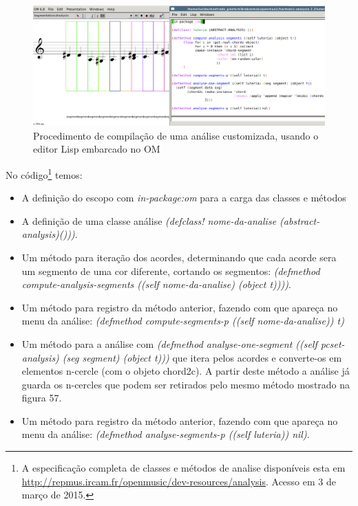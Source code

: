 \documentclass[
	12pt,				%
	openright,			%
	twoside,			%
	a4paper,			%
	english,			%
	french,				%
	spanish,			%
	brazil				%
	]{abntex2}
\begin{document}
				
\begin{figure}[!h]
	\caption{\label{fig_grafico}Procedimento de compilação de uma análise customizada, usando o editor Lisp embarcado no OM }
	\begin{center}
	    \includegraphics[scale=0.3]{OM_settheory/Analise_customizada.png}
	\end{center}
\end{figure}	

No código\footnote{A especificação completa de classes e métodos de analise disponíveis esta em \url{http://repmus.ircam.fr/openmusic/dev-resources/analysis}. Acesso em 3 de março de 2015.} temos: 

\begin{itemize}

\item A definição do escopo com \textit{in-package:om} para a carga das classes e métodos

\item A definição de uma classe análise \textit{(defclass! nome-da-analise (abstract-analysis)()))}. 

\item Um método para iteração dos acordes, determinando que cada acorde sera um segmento de uma cor diferente, cortando os segmentos: \textit{(defmethod compute-analysis-segments ((self nome-da-analise) (object t))))}.

\item Um método para registro da método anterior, fazendo com que apareça no menu da análise: \textit{(defmethod compute-segments-p ((self nome-da-analise)) t)}

\item Um método para a análise com \textit{(defmethod analyse-one-segment ((self pcset-analysis) (seg segment) (object t)))} que itera pelos acordes e converte-os em elementos n-cercle (com o objeto chord2c). A partir deste método a análise já guarda os n-cercles que podem ser retirados pelo mesmo método mostrado na figura 57.

\item Um método para registro da método anterior, fazendo com que apareça no menu da análise: \textit{(defmethod analyse-segments-p ((self luteria)) nil)}.
				
\end{itemize}
			
\end{document}
